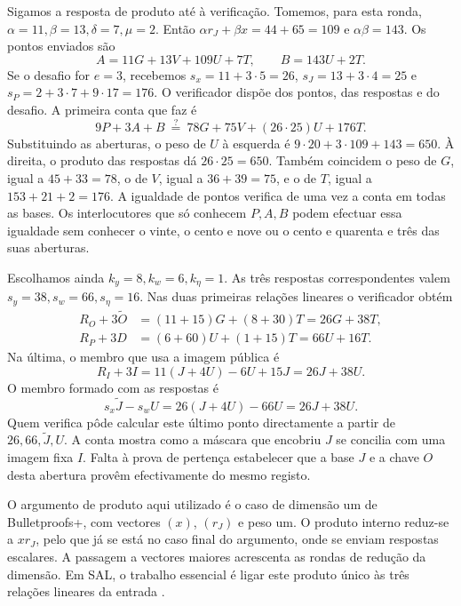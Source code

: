 Sigamos a resposta de produto até à verificação. Tomemos,
para esta ronda, \(\alpha=11,\beta=13,\delta=7,\mu=2\).
Então \(\alpha r_J+\beta x=44+65=109\) e
\(\alpha\beta=143\). Os pontos enviados são
\[
    A=11G+13V+109U+7T,\qquad B=143U+2T .
\]
Se o desafio for \(e=3\), recebemos
\(s_x=11+3\cdot5=26\), \(s_J=13+3\cdot4=25\) e
\(s_P=2+3\cdot7+9\cdot17=176\).
O verificador dispõe dos pontos, das respostas e do desafio.
A primeira conta que faz é
\[
             9P+3A+B
             \ \stackrel{?}{=}\ 78G+75V+(26\cdot25)U+176T .
\]
Substituindo as aberturas, o peso de \(U\) à esquerda é
\(9\cdot20+3\cdot109+143=650\). À direita, o produto das
respostas dá \(26\cdot25=650\). Também coincidem o peso de
\(G\), igual a \(45+33=78\), o de \(V\), igual a
\(36+39=75\), e o de \(T\), igual a \(153+21+2=176\).
A igualdade de pontos verifica de uma vez a conta em todas as
bases. Os interlocutores que só conhecem \(P,A,B\) podem efectuar
essa igualdade sem conhecer o vinte, o cento e nove ou o cento
e quarenta e três das suas aberturas.

Escolhamos ainda \(k_y=8,k_w=6,k_\eta=1\). As três respostas
correspondentes valem \(s_y=38,s_w=66,s_\eta=16\). Nas duas
primeiras relações lineares o verificador obtém
\[
 \begin{aligned}
 R_O+3\widetilde O&=(11+15)G+(8+30)T=26G+38T,\\
 R_P+3D&=(6+60)U+(1+15)T=66U+16T .
 \end{aligned}
\]
Na última, o membro que usa a imagem pública é
\[
 R_I+3I=11(J+4U)-6U+15J=26J+38U .
\]
O membro formado com as respostas é
\[
 s_x\widetilde J-s_wU=26(J+4U)-66U=26J+38U .
\]
Quem verifica pôde calcular este último ponto directamente a
partir de \(26,66,\widetilde J,U\). A conta mostra como a
máscara que encobriu \(J\) se concilia com uma imagem fixa
\(I\). Falta à prova de pertença estabelecer que a base
\(J\) e a chave \(O\) desta abertura provêm efectivamente do mesmo
registo.

O argumento de produto aqui utilizado é o caso de dimensão um
de Bulletproofs+, com vectores \((x)\), \((r_J)\) e peso um.
O produto interno reduz-se a \(xr_J\), pelo que já se está no
caso final do argumento, onde se enviam respostas escalares.
A passagem a vectores maiores acrescenta as rondas de redução
da dimensão. Em SAL, o trabalho essencial é ligar este produto
único às três relações lineares da entrada
\cite{bulletproofs-plus-paper}.


